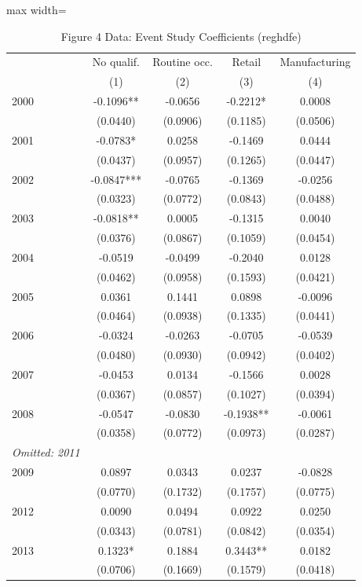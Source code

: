 \begin{table}[htbp]
\centering
\caption{Figure 4 Data: Event Study Coefficients (reghdfe)}
\label{tab:fetzer_fig4}
\begin{adjustbox}{max width=\textwidth}
\begin{tabular}{lcccc}
\toprule
 & No qualif. & Routine occ. & Retail & Manufacturing \\
 & (1) & (2) & (3) & (4) \\
\midrule
2000 & -0.1096** & -0.0656 & -0.2212* & 0.0008 \\
 & (0.0440) & (0.0906) & (0.1185) & (0.0506) \\
2001 & -0.0783* & 0.0258 & -0.1469 & 0.0444 \\
 & (0.0437) & (0.0957) & (0.1265) & (0.0447) \\
2002 & -0.0847*** & -0.0765 & -0.1369 & -0.0256 \\
 & (0.0323) & (0.0772) & (0.0843) & (0.0488) \\
2003 & -0.0818** & 0.0005 & -0.1315 & 0.0040 \\
 & (0.0376) & (0.0867) & (0.1059) & (0.0454) \\
2004 & -0.0519 & -0.0499 & -0.2040 & 0.0128 \\
 & (0.0462) & (0.0958) & (0.1593) & (0.0421) \\
2005 & 0.0361 & 0.1441 & 0.0898 & -0.0096 \\
 & (0.0464) & (0.0938) & (0.1335) & (0.0441) \\
2006 & -0.0324 & -0.0263 & -0.0705 & -0.0539 \\
 & (0.0480) & (0.0930) & (0.0942) & (0.0402) \\
2007 & -0.0453 & 0.0134 & -0.1566 & 0.0028 \\
 & (0.0367) & (0.0857) & (0.1027) & (0.0394) \\
2008 & -0.0547 & -0.0830 & -0.1938** & -0.0061 \\
 & (0.0358) & (0.0772) & (0.0973) & (0.0287) \\
\midrule
\textit{Omitted: 2011} & & & & \\
\midrule
2009 & 0.0897 & 0.0343 & 0.0237 & -0.0828 \\
 & (0.0770) & (0.1732) & (0.1757) & (0.0775) \\
2012 & 0.0090 & 0.0494 & 0.0922 & 0.0250 \\
 & (0.0343) & (0.0781) & (0.0842) & (0.0354) \\
2013 & 0.1323* & 0.1884 & 0.3443** & 0.0182 \\
 & (0.0706) & (0.1669) & (0.1579) & (0.0418) \\

\end{tabular}
\end{adjustbox}
\end{table}
